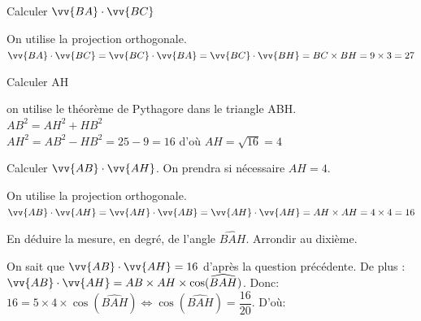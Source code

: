 \documentclass[12pt,a4paper]{article}  %
\begin{document}
\begin{enumMet}
    \item Calculer $\vv{B A} \cdot \vv{B C}$ \quad {}
    \begin{corrBox}
    	On utilise la projection orthogonale.\\
    	$\vv{B A} \cdot \vv{B C}=\vv{B C} \cdot \vv{B A}=\vv{B C} \cdot \vv{B H}=B C \times B H=9 \times 3=27$
    \end{corrBox}
    \item Calculer AH \quad {}\\
    \begin{corrBox}
    	on utilise le théorème de Pythagore dans le triangle ABH.\\
    	$A B^{2}=A H^{2}+H B^{2}$\\
    	$A H^{2}=A B^{2}-H B^{2}=25-9=16$ d'où $A H=\sqrt{16}=4$
    \end{corrBox}
    \item Calculer $\vv{A B} \cdot \vv{A H}$. On prendra si nécessaire $AH=4$. \quad {}
     \begin{corrBox}
    	On utilise la projection orthogonale.\\
    	$\vv{AB} \cdot \vv{AH}=\vv{AH} \cdot \vv{AB}=\vv{AH} \cdot \vv{AH}=AH \times AH=4 \times 4=16$
    \end{corrBox}
    \item En déduire la mesure, en degré, de l'angle $\widehat{B A H}$. Arrondir au dixième. \quad {}
    \begin{corrBox}
    	On sait que $\vv{AB} \cdot \vv{AH}=16$ d'après la question précédente. De plus :\\
    	$\vv{AB} \cdot \vv{AH}=AB\times AH\times \cos(\widehat{BAH})$. Donc:\\
    	$16=5\times4\times \cos(\widehat{BAH})\iff  \cos(\widehat{BAH})=\dfrac{16}{20}$. D'où: 
    \end{corrBox}
\end{enumMet}

%

%
%
\end{document}
